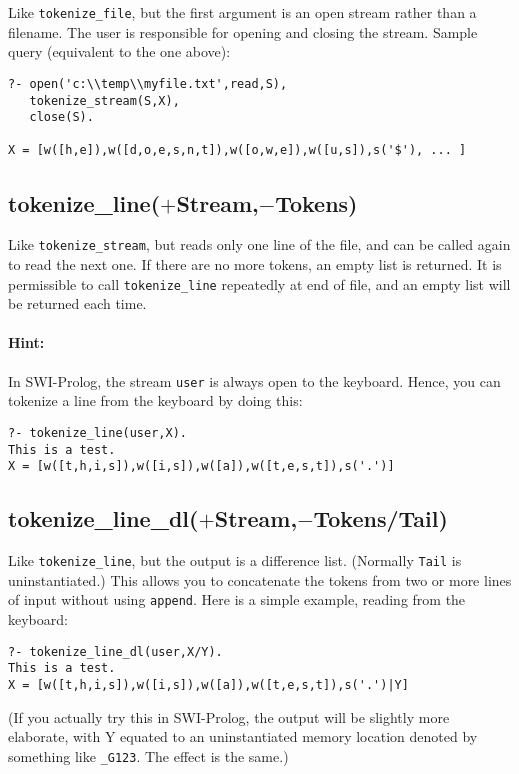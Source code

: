\documentclass[12pt]{article}
\begin{document}
Like \verb"tokenize_file", but the first argument is an open stream
rather than a filename.
The user is responsible for opening and closing the stream.
Sample query (equivalent to the one above):
\begin{verbatim}
?- open('c:\\temp\\myfile.txt',read,S),
   tokenize_stream(S,X),
   close(S).

X = [w([h,e]),w([d,o,e,s,n,t]),w([o,w,e]),w([u,s]),s('$'), ... ]
\end{verbatim}

\subsection*{tokenize\_line($+$Stream,$-$Tokens)}

Like \verb"tokenize_stream", but reads only one line of the file, and
can be called again to read the next one.
If there are no more tokens, an empty list is returned.
It is permissible to call \verb"tokenize_line" repeatedly
at end of file, and an empty list will be returned each time.

\paragraph{Hint:} In SWI-Prolog, the stream \verb"user" is always open
to the keyboard.  Hence, you can tokenize a line from the keyboard
by doing this:
\begin{verbatim}
?- tokenize_line(user,X).
This is a test.
X = [w([t,h,i,s]),w([i,s]),w([a]),w([t,e,s,t]),s('.')]
\end{verbatim}

\subsection*{tokenize\_line\_dl($+$Stream,$-$Tokens/Tail)}

Like \verb"tokenize_line", but the output is a difference list.
(Normally \verb"Tail" is uninstantiated.)
This allows you to concatenate the tokens from two or more lines of input
without using \verb"append".
Here is a simple example, reading from the keyboard:
\begin{verbatim}
?- tokenize_line_dl(user,X/Y).
This is a test.
X = [w([t,h,i,s]),w([i,s]),w([a]),w([t,e,s,t]),s('.')|Y]
\end{verbatim}
(If you actually try this in SWI-Prolog, the output will be slightly more
elaborate, with Y equated to an uninstantiated memory location
denoted by something like \verb"_G123".  The effect is the same.)
\end{document}
